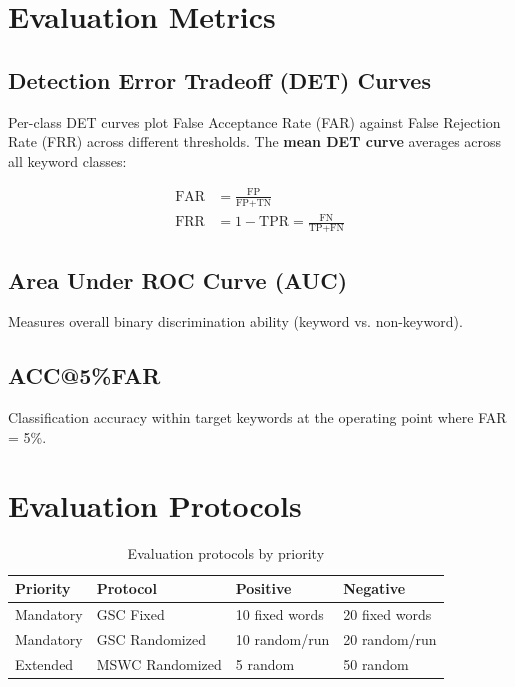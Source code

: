 \documentclass[12pt,a4paper]{report}
\begin{document}
\section{Evaluation Metrics}

\subsection{Detection Error Tradeoff (DET) Curves}

Per-class DET curves plot False Acceptance Rate (FAR) against False Rejection
Rate (FRR) across different thresholds. The \textbf{mean DET curve} averages
across all keyword classes:

\begin{align}
    \text{FAR} &= \frac{\text{FP}}{\text{FP} + \text{TN}} \\
    \text{FRR} &= 1 - \text{TPR} = \frac{\text{FN}}{\text{TP} + \text{FN}}
\end{align}

\subsection{Area Under ROC Curve (AUC)}

Measures overall binary discrimination ability (keyword vs. non-keyword).

\subsection{ACC@5\%FAR}

Classification accuracy within target keywords at the operating point where
FAR = 5\%.

\section{Evaluation Protocols}

\begin{table}[h]
\centering
\caption{Evaluation protocols by priority}
\label{tab:protocols}
\begin{tabular}{llll}
\toprule
\textbf{Priority} & \textbf{Protocol} & \textbf{Positive} & \textbf{Negative} \\
\midrule
Mandatory & GSC Fixed & 10 fixed words & 20 fixed words \\
Mandatory & GSC Randomized & 10 random/run & 20 random/run \\
Extended & MSWC Randomized & 5 random & 50 random \\
\bottomrule
\end{tabular}
\end{table}
\end{document}
